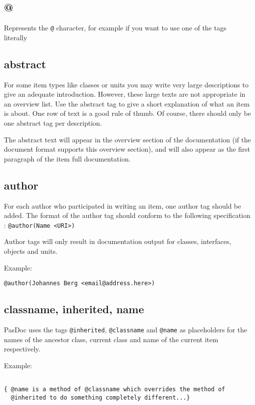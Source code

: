 \documentclass[11pt]{article}
\begin{document}
\subsection{@}
Represents the {\tt @} character, for example if you want to use one 
of the tags literally 

\subsection{abstract}

For some item types like classes or units you may write very large
descriptions to give an adequate introduction.
However, these large texts are not appropriate in an overview list.
Use the abstract tag to give a short explanation of what an item
is about. 
One row of text is a good rule of thumb.
Of course, there should only be one abstract tag per description.

The abstract text will appear in the overview section of the
documentation (if the document format supports this overview section), 
and will also appear as the first paragraph of the item full 
documentation.

\subsection{author}

For each author who participated in writing an item, one author tag
should be added. The format of the author tag should conform to
the following specification : {\tt @author(Name <URI>)}

Author tags will only result in documentation output for
classes, interfaces, objects and units.

Example:
\begin{verbatim}
@author(Johannes Berg <email@address.here>)
\end{verbatim}

\subsection{classname, inherited, name}

PasDoc uses the tags {\tt @inherited}, {\tt @classname} and {\tt @name} as 
placeholders for the names of the ancestor class, current class and name of the 
current item respectively.

Example:
\begin{verbatim}

{ @name is a method of @classname which overrides the method of 
  @inherited to do something completely different...}
\end{verbatim}
\end{document}
